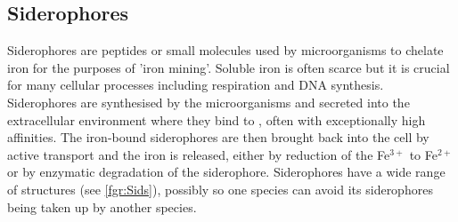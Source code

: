 \subsection{Siderophores}

Siderophores are peptides or small molecules used by microorganisms to chelate iron for the purposes of 'iron mining'\cite{Hider2010}. Soluble iron is often scarce but it is crucial for many cellular processes including respiration and DNA synthesis. Siderophores are synthesised by the microorganisms and secreted into the extracellular environment where they bind to , often with exceptionally high affinities. The iron-bound siderophores are then brought back into the cell by active transport and the iron is released, either by reduction of the Fe$^{3+}$ to Fe$^{2+}$ or by enzymatic degradation of the siderophore. Siderophores have a wide range of structures (see \ref{fgr:Sids}), possibly so one species can avoid its siderophores being taken up by another species\cite{Seyedsayamdost2012}.

